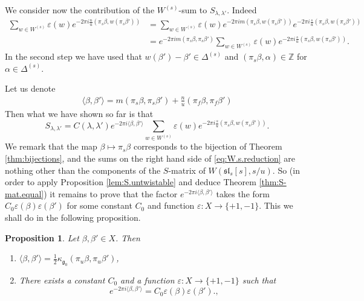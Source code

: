 \documentclass[12pt]{amsart}
\theoremstyle{plain}
\newtheorem{prop}[thm]{Proposition}
\theoremstyle{definition}
\newtheorem{rem}[thm]{Remark}
\numberwithin{equation}{section}
\newcommand{\beset}{X}
\newcommand{\al}{\alpha}
\newcommand{\la}{\lambda}
\newcommand{\D}{\Delta}
\newcommand{\Z}{\mathbb{Z}}
\newcommand{\g}{\mathfrak{g}}
\newcommand{\sll}{\mathfrak{sl}}
\begin{document}


We consider now the contribution of the $W^{(s)}$-sum to $S_{\la, \la'}$. Indeed
\begin{align}
\sum_{w \in W^{(s)}} \varepsilon(w) e^{-2\pi i \frac{n}{u} (\pi_s\beta, w(\pi_s\beta'))} 
%
&= \sum_{w \in W^{(s)}} \varepsilon(w) e^{-2\pi i m (\pi_s\beta, w(\pi_s\beta'))} e^{-2\pi i \frac{s}{u} (\pi_s\beta, w(\pi_s\beta'))} \nonumber \\
%
&= e^{-2\pi i m (\pi_s\beta, \pi_s\beta')} \sum_{w \in W^{(s)}} \varepsilon(w) e^{-2\pi i \frac{s}{u} (\pi_s\beta, w(\pi_s\beta'))}. \label{eq:W.s.reduction}
\end{align}
In the second step we have used that $w(\beta')-\beta' \in \D^{(s)}$ and $(\pi_s\beta, \al) \in \Z$ for $\al \in \D^{(s)}$.



Let us denote
\begin{align}\label{eq:sfform.def}
\langle \beta, \beta' \rangle = m (\pi_s\beta, \pi_s\beta') + \frac{n}{u} (\pi_f\beta, \pi_f\beta')
\end{align}
Then what we have shown so far is that
\[
S_{\la, \la'} = C(\la, \la') e^{-2\pi i \langle \beta, \beta' \rangle} \sum_{w \in W^{(s)}} \varepsilon(w) e^{-2\pi i \frac{s}{u} (\pi_s\beta, w(\pi_s\beta'))}.
\]
We remark that the map $\beta \mapsto \pi_s \beta$ corresponds to the bijection of Theorem \ref{thm:bijections}, and the sums on the right hand side of \eqref{eq:W.s.reduction} are nothing other than the components of the $S$-matrix of $W(\sll_s[s], s/u)$. So (in order to apply Proposition \ref{lem:S.untwistable} and deduce Theorem \ref{thm:S-mat.equal}) it remains to prove that the factor $e^{-2\pi i \langle \beta, \beta' \rangle}$ takes the form $C_0 \varepsilon(\beta) \varepsilon(\beta')$ for some constant $C_0$ and function $\varepsilon : \beset \rightarrow \{+1, -1\}$. This we shall do in the following proposition.
\begin{prop}\label{prop:s.f.relation} Let $\beta, \beta' \in \beset$. Then
\begin{enumerate}
\item $\langle \beta, \beta' \rangle = \frac{1}{2}\kappa_{\g_0}(\pi_u\beta, \pi_u\beta')$,

\item There exists a constant $C_0$ and a function $\varepsilon : \beset \rightarrow \{+1, -1\}$ such that
\[
e^{-2\pi i \langle \beta, \beta' \rangle} = C_0 \varepsilon(\beta) \varepsilon(\beta').,
\]
\end{enumerate}
\end{prop}
\end{document}
